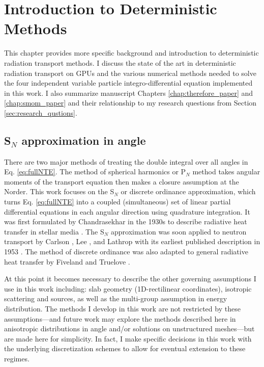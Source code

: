 \chapter{Introduction to Deterministic Methods}
\label{chap:determ_intro}


This chapter provides more specific background and introduction to deterministic radiation transport methods.
I discuss the state of the art in deterministic radiation transport on GPUs and the various numerical methods needed to solve the four independent variable particle integro-differential equation implemented in this work.
I also summarize manuscript Chapters \ref{chap:therefore_paper} and \ref{chap:smom_paper} and their relationship to my research questions from Section \ref{sec:research_qustions}.

\section{S$_N$ approximation in angle}

There are two major methods of treating the double integral over all angles in Eq. \ref{eq:fullNTE}.
The method of spherical harmonics or P$_{N}$ method takes angular moments of the transport equation then makes a closure assumption at the N\ths  order.
This work focuses on the S$_N$ or discrete ordinance approximation, which turns Eq. \ref{eq:fullNTE} into a coupled (simultaneous) set of linear partial differential equations in each angular direction using quadrature integration.
It was first formulated by Chandrasekhar in the 1930s to describe radiative heat transfer in stellar media \cite{chandrasekhar1960radiative}.
The S$_N$ approximation was soon applied to neutron transport by Carlson \cite{precise1971carlson}, Lee \cite{discrete1961lee}, and Lathrop \cite{discrete1966lathnrop} with its earliest published description in 1953 \cite{carlson_1955_sn}.
The method of discrete ordinance was also adapted to general radiative heat transfer by Fiveland \cite{three1988fiveland} and Truelove \cite{discrete1987truelove}.

At this point it becomes necessary to describe the other governing assumptions I use in this work including:
slab geometry (1D-rectilinear coordinates), isotropic scattering and sources, as well as the multi-group assumption in energy distribution.
The methods I develop in this work are not restricted by these assumptions---and future work may explore the methods described here in anisotropic distributions in angle and/or solutions on unstructured meshes---but are made here for simplicity.
In fact, I make specific decisions in this work with the underlying discretization schemes to allow for eventual extension to these regimes.

